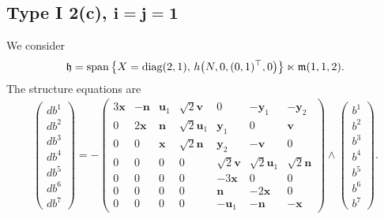 \documentclass[pdftex]{sigma}
\numberwithin{equation}{section}
\newcommand\fh{{\frak h}}
\newcommand\fm{{\frak m}}
\newcommand\bx{{\mathbf x}}
\newcommand\bu{{\mathbf u}}
\newcommand\by{{\mathbf y}}
\newcommand\bn{{\mathbf n}}
\newcommand\bv{{\mathbf v}}
\newcommand{\Span}{\operatorname{span}}
\newcommand{\diag}{\operatorname{diag}}
\begin{document}
\subsection[Type I 2(c), $i=j=1$]{Type I 2(c), $\boldsymbol{i=j=1}$}
We consider
\begin{gather*}\fh=\Span\big\{X=\diag(2,1), \, h\big(N,0,(0,1)^\top,0\big) \big\}\ltimes\fm(1,1,2).\end{gather*}
The structure equations are
\begin{gather}\label{EI2(c)ij=1}\left(\begin{matrix} db^1\\db^2\\db^3\\db^4\\db^5\\db^6\\db^7\end{matrix}\right) = -\left(
\begin{matrix}
3{\bx} &-\bn&\bu_1&\sqrt2 \bv&0&-\by_1&-\by_2\\
0&2\bx&\bn&\sqrt2 \bu_1&\by_1&0&\bv\\
0&0&\bx&\sqrt 2 \bn&\by_2&-\bv&0\\
0&0&0&0&\sqrt2 \bv&\sqrt2 \bu_1&\sqrt 2 \bn\\
0&0&0&0&-3\bx&0&0\\
0&0&0&0&\bn&-2\bx&0\\
0&0&0&0&-\bu_1&-\bn&-\bx
\end{matrix}\right) \wedge \left(\begin{matrix} b^1\\b^2\\b^3\\b^4\\b^5\\b^6\\b^7\end{matrix}\right).
\end{gather}
\end{document}
